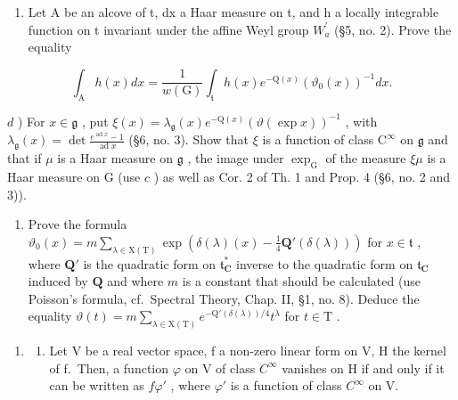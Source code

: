 \begin{enumerate}
\begin{enumerate}
\def\labelenumi{\alph{enumi})}
\setcounter{enumi}{2}
\tightlist
\item
  Let A be an alcove of t, dx a Haar measure on t, and h a locally integrable function on t invariant under the affine Weyl group \(W_{a}^{\prime}\) (§5, no. 2). Prove the equality
\end{enumerate}

\[
\int_ {\mathrm{A}} h (x) d x = \frac {1}{w (\mathrm{G})} \int_ {\mathfrak {t}} h (x) e ^ {- \mathrm{Q} (x)} (\vartheta_ {0} (x)) ^ {- 1} d x.
\]

\(d\) ) For \(x\in \mathfrak{g}\) , put \(\xi (x) = \lambda_{\mathfrak{g}}(x)e^{-\mathrm{Q}(x)}(\vartheta (\exp x))^{-1}\) , with \(\lambda_{\mathfrak{g}}(x) = \det \frac{e^{\operatorname*{ad}x} - 1}{\operatorname*{ad}x}\) (§6, no. 3). Show that \(\xi\) is a function of class \(\mathrm{C}^\infty\) on \(\mathfrak{g}\) and that if \(\mu\) is a Haar measure on \(\mathfrak{g}\) , the image under \(\exp_{\mathrm{G}}\) of the measure \(\xi \mu\) is a Haar measure on G (use \(c\) ) as well as Cor. 2 of Th. 1 and Prop. 4 (§6, no. 2 and 3)).

\begin{enumerate}
\def\labelenumi{\alph{enumi})}
\setcounter{enumi}{4}
\tightlist
\item
  Prove the formula \(\vartheta_0(x) = m\sum_{\lambda \in \mathrm{X(T)}}\exp (\delta (\lambda)(x) - \frac{1}{4}\mathbf{Q}'(\delta (\lambda)))\) for \(x\in \mathfrak{t}\) , where \(\mathbf{Q}'\) is the quadratic form on \(\mathfrak{t}_{\mathbf{C}}^{*}\) inverse to the quadratic form on \(\mathfrak{t}_{\mathbf{C}}\) induced by \(\mathbf{Q}\) and where \(m\) is a constant that should be calculated (use Poisson's formula, cf.~Spectral Theory, Chap. II, §1, no. 8). Deduce the equality \(\vartheta (t) = m\sum_{\lambda \in \mathrm{X(T)}}e^{-\mathrm{Q}'(\delta (\lambda)) / 4}t^{\lambda}\) for \(t\in \mathrm{T}\) .
\end{enumerate}

\begin{enumerate}
\def\labelenumi{\arabic{enumi})}
\setcounter{enumi}{4}
\tightlist
\item
  \begin{enumerate}
  \def\labelenumii{\alph{enumii})}
  \tightlist
  \item
    Let V be a real vector space, f a non-zero linear form on V, H the kernel of f.~Then, a function \(\varphi\) on V of class \(C^{\infty}\) vanishes on H if and only if it can be written as \(f\varphi'\) , where \(\varphi'\) is a function of class \(C^{\infty}\) on V.
  \end{enumerate}
\end{enumerate}


\end{enumerate}
